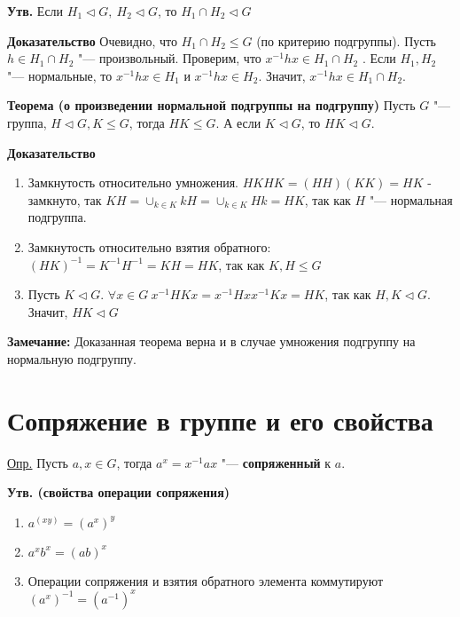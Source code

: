 \documentclass{article}
\begin{document}
\vspace{10pt}

\textbf{Утв.}
Если $H_1 \triangleleft G, \  H_2 \triangleleft G$, то $H_1 \cap H_2 \triangleleft G$

\textbf{Доказательство}
Очевидно, что $H_1 \cap H_2 \leq G$ (по критерию подгруппы). Пусть $h \in H_1 \cap H_2$ "--- произвольный. Проверим, что $x^{-1}hx \in H_1 \cap H_2$ . Если $H_1, H_2$ "--- нормальные, то $x^{-1}hx \in H_1$ и $x^{-1}hx \in H_2$. Значит, $x^{-1}hx \in H_1 \cap H_2$.

\vspace{10pt}

\textbf{Теорема (о произведении нормальной подгруппы на подгруппу)}
Пусть $G$ "--- группа, $H \triangleleft G, K \leq G$, тогда $HK \leq G$. А если $K \triangleleft G$, то $HK \triangleleft G$.

\textbf{Доказательство}
\begin{enumerate}
	\item Замкнутость относительно умножения. $HKHK = (HH)(KK) = HK$ - замкнуто, так $KH = \cup_{k \in K} kH = \cup_{k \in K} Hk = HK$, так как $H$ "--- нормальная подгруппа.
	\item Замкнутость относительно взятия обратного: $(HK)^{-1} = K^{-1}H^{-1} = KH = HK$, так как $K, H \leq G$
	\item Пусть $K \triangleleft G$. $\forall x \in G \     x^{-1}HKx = x^{-1}Hxx^{-1}Kx = HK$, так как $H, K \triangleleft G$. Значит, $HK \triangleleft G$
\end{enumerate}

\vspace{10pt}

\textbf{Замечание:}
Доказанная теорема верна и в случае умножения подгруппу на нормальную подгруппу.

\section{Сопряжение в группе и его свойства}

\underline{Опр.} Пусть $a, x \in G$, тогда $a^x = x^{-1}ax$ "--- \textbf{сопряженный} к $a$.

\vspace{10pt}

\textbf{Утв. (свойства операции сопряжения)}
\begin{enumerate}
	\item $a^{(xy)} = (a^x)^y$
	\item $a^xb^x = (ab)^x$
	\item Операции сопряжения и взятия обратного элемента коммутируют $(a^x)^{-1} = (a^{-1})^x$
\end{enumerate}
\end{document}
